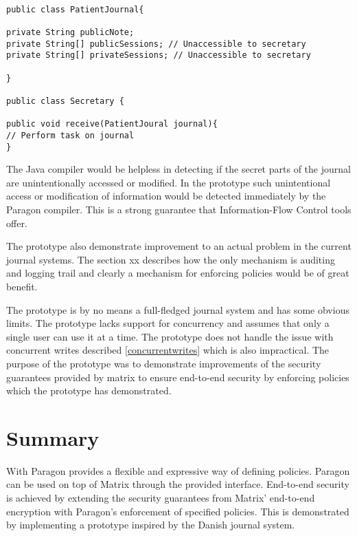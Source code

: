 \begin{lstlisting}

public class PatientJournal{

private String publicNote;
private String[] publicSessions; // Unaccessible to secretary
private String[] privateSessions; // Unaccessible to secretary

}

public class Secretary {

public void receive(PatientJoural journal){
// Perform task on journal
}

\end{lstlisting}

The Java compiler would be helpless in detecting if the secret parts of the journal are unintentionally accessed or modified. In the prototype such unintentional access or modification of information would be detected immediately by the Paragon compiler. This is a strong guarantee that Information-Flow Control tools offer.

The prototype also demonstrate improvement to an actual problem in the current journal systems. The section xx describes how the only mechanism is auditing and logging trail and clearly a mechanism for enforcing policies would be of great benefit. 

The prototype is by no means a full-fledged journal system and has some obvious limits. The prototype lacks support for concurrency and assumes that only a single user can use it at a time. The prototype does not handle the issue with concurrent writes described \ref{concurrentwrites} which is also impractical. The purpose of the prototype was to demonstrate improvements of the security guarantees provided by matrix to ensure end-to-end security by enforcing policies which the prototype has demonstrated.




\section{Summary}

With Paragon provides a flexible and expressive way of defining policies. Paragon can be used on top of Matrix through the provided interface. End-to-end security is achieved by extending the security guarantees from Matrix' end-to-end encryption with Paragon's enforcement of specified policies. This is demonstrated by implementing a prototype inspired by the Danish journal system.


